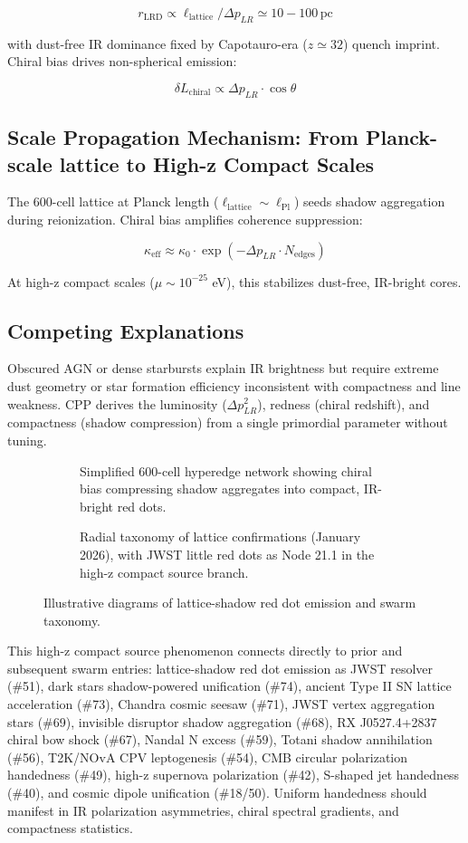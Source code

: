 \documentclass[11pt]{article}
\begin{document}
\[
r_{\text{LRD}} \propto \ell_{\text{lattice}} / \Delta p_{LR} \simeq 10-100 \, \text{pc}
\]

with dust-free IR dominance fixed by Capotauro-era ($z \simeq 32$) quench imprint. Chiral bias drives non-spherical emission:

\[
\delta L_{\text{chiral}} \propto \Delta p_{LR} \cdot \cos\theta
\]

\subsection{Scale Propagation Mechanism: From Planck-scale lattice to High-z Compact Scales}
The 600-cell lattice at Planck length ($\ell_{\text{lattice}} \sim \ell_{\text{Pl}}$) seeds shadow aggregation during reionization. Chiral bias amplifies coherence suppression:

\[
\kappa_{\text{eff}} \approx \kappa_0 \cdot \exp(-\Delta p_{LR} \cdot N_{\text{edges}})
\]

At high-z compact scales ($\mu \sim 10^{-25}$ eV), this stabilizes dust-free, IR-bright cores.

\subsection{Competing Explanations}
Obscured AGN or dense starbursts explain IR brightness but require extreme dust geometry or star formation efficiency inconsistent with compactness and line weakness. CPP derives the luminosity ($\Delta p_{LR}^2$), redness (chiral redshift), and compactness (shadow compression) from a single primordial parameter without tuning.

\begin{figure}[htbp]
\centering
\begin{subfigure}{0.45\textwidth}
\centering
\caption{Simplified 600-cell hyperedge network showing chiral bias compressing shadow aggregates into compact, IR-bright red dots.}
\label{fig:shadow-reddot}
\end{subfigure}
\hfill
\begin{subfigure}{0.45\textwidth}
\centering
\caption{Radial taxonomy of lattice confirmations (January 2026), with JWST little red dots as Node 21.1 in the high-z compact source branch.}
\label{fig:taxonomy}
\end{subfigure}
\caption{Illustrative diagrams of lattice-shadow red dot emission and swarm taxonomy.}
\end{figure}

This high-z compact source phenomenon connects directly to prior and subsequent swarm entries: lattice-shadow red dot emission as JWST resolver (\#51), dark stars shadow-powered unification (\#74), ancient Type II SN lattice acceleration (\#73), Chandra cosmic seesaw (\#71), JWST vertex aggregation stars (\#69), invisible disruptor shadow aggregation (\#68), RX J0527.4+2837 chiral bow shock (\#67), Nandal N excess (\#59), Totani shadow annihilation (\#56), T2K/NOvA CPV leptogenesis (\#54), CMB circular polarization handedness (\#49), high-z supernova polarization (\#42), S-shaped jet handedness (\#40), and cosmic dipole unification (\#18/50). Uniform handedness should manifest in IR polarization asymmetries, chiral spectral gradients, and compactness statistics.
\end{document}
